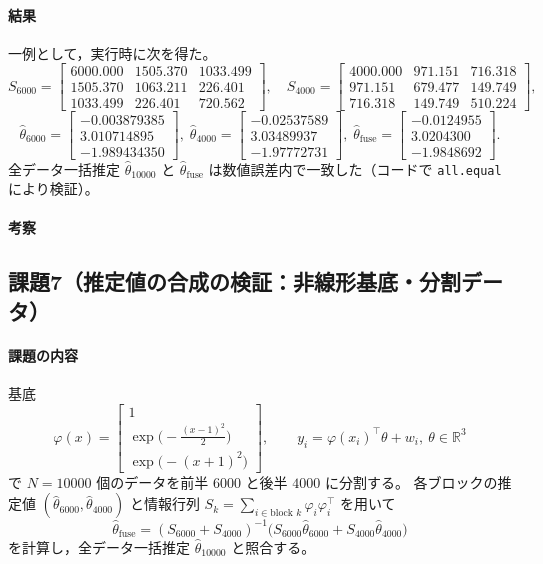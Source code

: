 \paragraph{結果}
一例として，実行時に次を得た。
\[
S_{6000}=
\begin{bmatrix}
6000.000 & 1505.370 & 1033.499\\
1505.370 & 1063.211 & 226.401\\
1033.499 & 226.401 & 720.562
\end{bmatrix},\quad
S_{4000}=
\begin{bmatrix}
4000.000 & 971.151 & 716.318\\
971.151 & 679.477 & 149.749\\
716.318 & 149.749 & 510.224
\end{bmatrix},
\]
\[
\hat\theta_{6000}=
\begin{bmatrix}
-0.003879385\\ 3.010714895\\ -1.989434350
\end{bmatrix},\;
\hat\theta_{4000}=
\begin{bmatrix}
-0.02537589\\ 3.03489937\\ -1.97772731
\end{bmatrix},\;
\hat\theta_{\mathrm{fuse}}=
\begin{bmatrix}
-0.0124955\\ 3.0204300\\ -1.9848692
\end{bmatrix}.
\]
全データ一括推定 $\hat\theta_{10000}$ と $\hat\theta_{\mathrm{fuse}}$ は数値誤差内で一致した（コードで \verb|all.equal| により検証）。

\paragraph{考察}

\subsection{課題7（推定値の合成の検証：非線形基底・分割データ）}

\paragraph{課題の内容}
基底
\[
  \varphi(x)=
  \begin{bmatrix}
    1\\[1mm]
    \exp\!\bigl(-\tfrac{(x-1)^2}{2}\bigr)\\[1mm]
    \exp\!\bigl(-(x+1)^2\bigr)
  \end{bmatrix}\!,\qquad
  y_i=\varphi(x_i)^\top \theta+w_i,\ \theta\in\mathbb{R}^3
\]
で $N=10000$ 個のデータを前半 $6000$ と後半 $4000$ に分割する。
各ブロックの推定値 $(\hat\theta_{6000},\hat\theta_{4000})$ と情報行列
$S_k=\sum_{i\in\text{block }k}\varphi_i\varphi_i^\top$ を用いて
\[
  \hat\theta_{\mathrm{fuse}}
  =(S_{6000}+S_{4000})^{-1}\!\bigl(S_{6000}\hat\theta_{6000}+S_{4000}\hat\theta_{4000}\bigr)
\]
を計算し，全データ一括推定 $\hat\theta_{10000}$ と照合する。\cite{exp2025}

